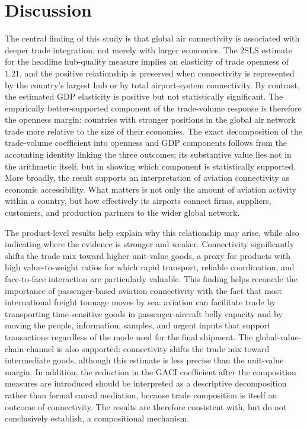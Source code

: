 \section{Discussion}
\label{sec:discussion}
The central finding of this study is that global air connectivity is
associated with deeper trade integration, not merely with larger economies.
The 2SLS estimate for the headline hub-quality measure implies an elasticity of trade openness of $1.21$, and the positive relationship is preserved when
connectivity is represented by the country's largest hub or by total
airport-system connectivity. By contrast, the estimated GDP elasticity is
positive but not statistically significant. The empirically better-supported
component of the trade-volume response is therefore the openness margin:
countries with stronger positions in the global air network trade more
relative to the size of their economies. The exact decomposition of the
trade-volume coefficient into openness and GDP components follows from the
accounting identity linking the three outcomes; its substantive value lies
not in the arithmetic itself, but in showing which component is statistically
supported. More broadly, the result supports an interpretation of aviation
connectivity as economic accessibility. What matters is not only the amount
of aviation activity within a country, but how effectively its airports
connect firms, suppliers, customers, and production partners to the wider
global network.

The product-level results help explain why this relationship may arise, while
also indicating where the evidence is stronger and weaker. Connectivity
significantly shifts the trade mix toward higher unit-value goods, a proxy
for products with high value-to-weight ratios for which rapid transport,
reliable coordination, and face-to-face interaction are particularly
valuable. This finding helps reconcile the importance of passenger-based
aviation connectivity with the fact that most international freight tonnage
moves by sea: aviation can facilitate trade by transporting time-sensitive
goods in passenger-aircraft belly capacity and by moving the people,
information, samples, and urgent inputs that support transactions regardless
of the mode used for the final shipment. The global-value-chain channel is also supported: connectivity shifts the trade mix toward intermediate goods, although this estimate is less precise than the unit-value margin. In addition, the reduction in the GACI coefficient after the composition
measures are introduced should be interpreted as a descriptive decomposition
rather than formal causal mediation, because trade composition is itself an
outcome of connectivity. The results are therefore consistent with, but do
not conclusively establish, a compositional mechanism.

